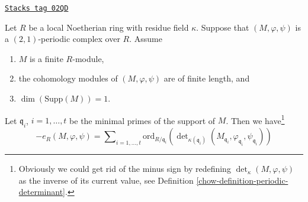 \begin{proposition}
\label{chow-proposition-length-determinant-periodic-complex}
\href{https://stacks.math.columbia.edu/tag/02QD}{\texttt{Stacks tag 02QD}}

Let $R$ be a local Noetherian ring with residue field $\kappa$.
Suppose that $(M, \varphi, \psi)$ is a $(2, 1)$-periodic
complex over $R$. Assume
\begin{enumerate}
\item $M$ is a finite $R$-module,
\item the cohomology modules of $(M, \varphi, \psi)$ are of finite length, and
\item $\dim(\text{Supp}(M)) = 1$.
\end{enumerate}
Let $\mathfrak q_i$, $i = 1, \ldots, t$ be the minimal
primes of the support of $M$. Then we have\footnote{
Obviously we could get rid of the minus sign by redefining
$\det_\kappa(M, \varphi, \psi)$ as the inverse of its
current value, see Definition \ref{chow-definition-periodic-determinant}.}
$$
- e_R(M, \varphi, \psi) =
\sum\nolimits_{i = 1, \ldots, t}
\text{ord}_{R/\mathfrak q_i}\left(
\det\nolimits_{\kappa(\mathfrak q_i)}
(M_{\mathfrak q_i}, \varphi_{\mathfrak q_i}, \psi_{\mathfrak q_i})
\right)
$$
\end{proposition}

